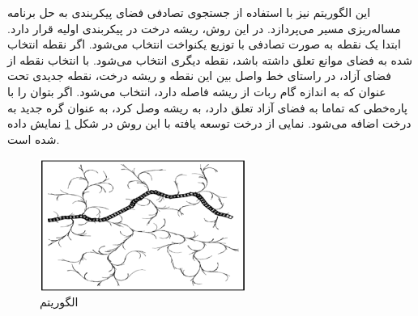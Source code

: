 این الگوریتم نیز با استفاده از جستجوی تصادفی فضای پیکربندی به حل برنامه مساله‌ریزی مسیر می‌پردازد. در این روش، ریشه درخت در پیکربندی اولیه قرار دارد. ابتدا یک نقطه به صورت تصادفی با توزیع یکنواخت
\noindent\unskip{}
انتخاب می‌شود. اگر نقطه انتخاب شده به فضای موانع تعلق داشته باشد، نقطه دیگری انتخاب می‌شود. با انتخاب نقطه از فضای آزاد، در راستای خط واصل بین این نقطه و ریشه درخت، نقطه جدیدی تحت عنوان
که به اندازه گام ربات از ریشه فاصله دارد، انتخاب می‌شود.
اگر بتوان
را با پاره‌خطی که تماما به فضای آزاد تعلق دارد، به ریشه وصل کرد،
به عنوان گره جدید به درخت اضافه می‌شود.
نمایی از درخت توسعه یافته با این روش در شکل
\ref{RRT}
نمایش داده شده است.
\begin{figure}[H]
	\centering
	\includegraphics[width=0.6\textwidth]{./images/Chapter2/RRT}	
	\caption[الگوریتم ]{الگوریتم  \cite{MohadesKhorasani}}
	\label{RRT}
\end{figure}
\noindent
\unskip



